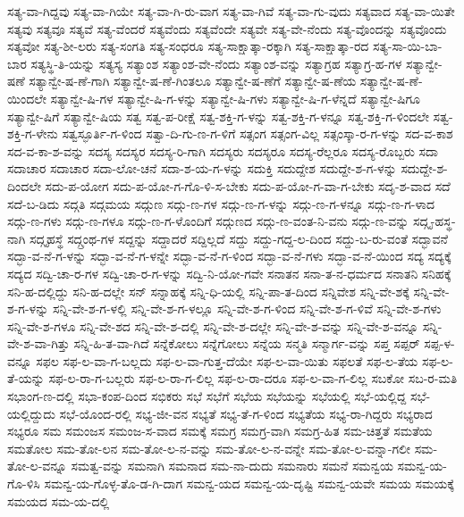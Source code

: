 {ಸತ್ಯ-ವಾ-ಗಿದ್ದವು
ಸತ್ಯ-ವಾ-ಗಿಯೇ
ಸತ್ಯ-ವಾ-ಗಿ-ರು-ವಾಗ
ಸತ್ಯ-ವಾ-ಗಿವೆ
ಸತ್ಯ-ವಾ-ಗು-ವುದು
ಸತ್ಯವಾದ
ಸತ್ಯ-ವಾ-ಯಿತೇ
ಸತ್ಯವು
ಸತ್ಯವೂ
ಸತ್ಯವೆ
ಸತ್ಯ-ವೆಂದರೆ
ಸತ್ಯವೆಂದು
ಸತ್ಯವೆಂದೇ
ಸತ್ಯವೇ
ಸತ್ಯ-ವೇ-ನೆಂದು
ಸತ್ಯ-ವೊಂದನ್ನು
ಸತ್ಯವೊಂದು
ಸತ್ಯವೋ
ಸತ್ಯ-ಶೀ-ಲರು
ಸತ್ಯ-ಸಂಗತಿ
ಸತ್ಯ-ಸಂಧರೂ
ಸತ್ಯ-ಸಾಕ್ಷಾತ್ಕಾ-ರಕ್ಕಾಗಿ
ಸತ್ಯ-ಸಾಕ್ಷಾತ್ಕಾ-ರದ
ಸತ್ಯ-ಸಾ-ಯಿ-ಬಾ-ಬಾರ
ಸತ್ಯಸ್ಥಿ-ತಿ-ಯನ್ನು
ಸತ್ಯಸ್ಯ
ಸತ್ಯಾಂಶ
ಸತ್ಯಾಂಶ-ವೇ-ನೆಂದು
ಸತ್ಯಾಂಶ-ವನ್ನು
ಸತ್ಯಾಗ್ರಹ
ಸತ್ಯಾಗ್ರ-ಹ-ಗಳ
ಸತ್ಯಾನ್ವೇ-ಷಣೆ
ಸತ್ಯಾನ್ವೇ-ಷ-ಣೆ-ಗಾಗಿ
ಸತ್ಯಾನ್ವೇ-ಷ-ಣೆ-ಗಿಂತಲೂ
ಸತ್ಯಾನ್ವೇ-ಷ-ಣೆಗೆ
ಸತ್ಯಾನ್ವೇ-ಷ-ಣೆಯ
ಸತ್ಯಾನ್ವೇ-ಷ-ಣೆ-ಯಿಂದಲೇ
ಸತ್ಯಾನ್ವೇ-ಷಿ-ಗಳ
ಸತ್ಯಾನ್ವೇ-ಷಿ-ಗ-ಳನ್ನು
ಸತ್ಯಾನ್ವೇ-ಷಿ-ಗಳು
ಸತ್ಯಾನ್ವೇ-ಷಿ-ಗ-ಳೆನ್ನದೆ
ಸತ್ಯಾನ್ವೇ-ಷಿಗೂ
ಸತ್ಯಾನ್ವೇ-ಷಿಗೆ
ಸತ್ಯಾನ್ವೇ-ಷಿಯ
ಸತ್ವ
ಸತ್ವ-ಪ-ರೀಕ್ಷೆ
ಸತ್ವ-ಶಕ್ತಿ-ಗ-ಳನ್ನು
ಸತ್ವ-ಶಕ್ತಿ-ಗ-ಳನ್ನೂ
ಸತ್ವ-ಶಕ್ತಿ-ಗ-ಳಿಂದಲೇ
ಸತ್ವ-ಶಕ್ತಿ-ಗ-ಳೇನು
ಸತ್ವಸ್ಫೂರ್ತಿ-ಗ-ಳಿಂದ
ಸತ್ವಾ-ದಿ-ಗು-ಣ-ಗ-ಳಿಗೆ
ಸತ್ಸಂಗ
ಸತ್ಸಂಗ-ವಿಲ್ಲ
ಸತ್ಸಂಸ್ಕಾ-ರ-ಗ-ಳನ್ನು
ಸದ-ವ-ಕಾಶ
ಸದ-ವ-ಕಾ-ಶ-ವನ್ನು
ಸದಸ್ಯ
ಸದಸ್ಯರ
ಸದಸ್ಯ-ರಿ-ಗಾಗಿ
ಸದಸ್ಯರು
ಸದಸ್ಯರೂ
ಸದಸ್ಯ-ರೆಲ್ಲರೂ
ಸದಸ್ಯ-ರೊಬ್ಬರು
ಸದಾ
ಸದಾಚಾರ
ಸದಾಚಾರ
ಸದಾ-ಲೋ-ಚನೆ
ಸದಾ-ಶ-ಯ-ಗ-ಳನ್ನು
ಸದುಕ್ತಿ
ಸದುದ್ದೇಶ
ಸದುದ್ದೇ-ಶ-ಗ-ಳನ್ನು
ಸದುದ್ದೇ-ಶ-ದಿಂದಲೇ
ಸದು-ಪ-ಯೋಗ
ಸದು-ಪ-ಯೋ-ಗ-ಗೊ-ಳಿ-ಸ-ಬೇಕು
ಸದು-ಪ-ಯೋ-ಗ-ವಾ-ಗ-ಬೇಕು
ಸದೃ-ಶ-ವಾದ
ಸದೆ
ಸದೆ-ಬ-ಡಿದು
ಸದ್ಗತಿ
ಸದ್ಗಮಯ
ಸದ್ಗುಣ
ಸದ್ಗು-ಣ-ಗಳ
ಸದ್ಗು-ಣ-ಗ-ಳನ್ನು
ಸದ್ಗು-ಣ-ಗ-ಳನ್ನೂ
ಸದ್ಗು-ಣ-ಗ-ಳಾದ
ಸದ್ಗು-ಣ-ಗಳು
ಸದ್ಗು-ಣ-ಗಳೂ
ಸದ್ಗು-ಣ-ಗ-ಳೊಂದಿಗೆ
ಸದ್ಗುಣದ
ಸದ್ಗು-ಣ-ವಂತ-ನಿ-ವನು
ಸದ್ಗು-ಣ-ವನ್ನು
ಸದ್ಗೃ-ಹಸ್ಥ-ನಾಗಿ
ಸದ್ಗೃಹಸ್ಥೆ
ಸದ್ಗ್ರಂಥ-ಗಳ
ಸದ್ದನ್ನು
ಸದ್ದಾದರೆ
ಸದ್ದಿಲ್ಲದೆ
ಸದ್ದು
ಸದ್ದು-ಗದ್ದ-ಲ-ದಿಂದ
ಸದ್ದು-ಬ-ರು-ವಂತೆ
ಸದ್ಭಾವನೆ
ಸದ್ಭಾ-ವ-ನೆ-ಗ-ಳನ್ನು
ಸದ್ಭಾ-ವ-ನೆ-ಗ-ಳನ್ನೇ
ಸದ್ಭಾ-ವ-ನೆ-ಗ-ಳಿಂದ
ಸದ್ಭಾ-ವ-ನೆ-ಗಳು
ಸದ್ಭಾ-ವ-ನೆ-ಯಿಂದ
ಸದ್ಯ
ಸದ್ಯಕ್ಕೆ
ಸದ್ಯದ
ಸದ್ವಿ-ಚಾ-ರ-ಗಳ
ಸದ್ವಿ-ಚಾ-ರ-ಗ-ಳನ್ನು
ಸದ್ವಿ-ನಿ-ಯೋ-ಗವೇ
ಸನಾತನ
ಸನಾ-ತ-ನ-ಧರ್ಮದ
ಸನಾತನಿ
ಸನಿಹಕ್ಕೆ
ಸನಿ-ಹ-ದಲ್ಲಿದ್ದು
ಸನಿ-ಹ-ದಲ್ಲೇ
ಸನ್
ಸನ್ನಾಹಕ್ಕೆ
ಸನ್ನಿ-ಧಿ-ಯಲ್ಲಿ
ಸನ್ನಿ-ಪಾ-ತ-ದಿಂದ
ಸನ್ನಿವೇಶ
ಸನ್ನಿ-ವೇ-ಶಕ್ಕೆ
ಸನ್ನಿ-ವೇ-ಶ-ಗ-ಳನ್ನು
ಸನ್ನಿ-ವೇ-ಶ-ಗ-ಳಲ್ಲಿ
ಸನ್ನಿ-ವೇ-ಶ-ಗ-ಳಲ್ಲೂ
ಸನ್ನಿ-ವೇ-ಶ-ಗ-ಳಿಂದ
ಸನ್ನಿ-ವೇ-ಶ-ಗ-ಳಿವೆ
ಸನ್ನಿ-ವೇ-ಶ-ಗಳು
ಸನ್ನಿ-ವೇ-ಶ-ಗಳೂ
ಸನ್ನಿ-ವೇ-ಶದ
ಸನ್ನಿ-ವೇ-ಶ-ದಲ್ಲಿ
ಸನ್ನಿ-ವೇ-ಶ-ದಲ್ಲೇ
ಸನ್ನಿ-ವೇ-ಶ-ವನ್ನು
ಸನ್ನಿ-ವೇ-ಶ-ವನ್ನೂ
ಸನ್ನಿ-ವೇ-ಶ-ವಾ-ಗಿತ್ತು
ಸನ್ನಿ-ಹಿ-ತ-ವಾ-ಗಿದೆ
ಸನ್ನೆಕೋಲು
ಸನ್ನೆಗೋಲು
ಸನ್ನೆಯ
ಸನ್ಮತಿ
ಸನ್ಮಾರ್ಗ-ವನ್ನು
ಸಪ್ತ
ಸಪ್ಪರ್
ಸಪ್ಪ-ಳ-ವನ್ನೂ
ಸಫಲ
ಸಫ-ಲ-ವಾ-ಗ-ಬಲ್ಲದು
ಸಫ-ಲ-ವಾ-ಗುತ್ತ-ದೆಯೇ
ಸಫ-ಲ-ವಾ-ಯಿತು
ಸಫಲತೆ
ಸಫ-ಲ-ತೆಯ
ಸಫ-ಲ-ತೆ-ಯನ್ನು
ಸಫ-ಲ-ರಾ-ಗ-ಬಲ್ಲರು
ಸಫ-ಲ-ರಾ-ಗ-ಲಿಲ್ಲ
ಸಫ-ಲ-ರಾ-ದರೂ
ಸಫ-ಲ-ವಾ-ಗ-ಲಿಲ್ಲ
ಸಬಕೋ
ಸಬ-ರ-ಮತಿ
ಸಭಾಂಗ-ಣ-ದಲ್ಲಿ
ಸಭಾ-ಕಂಪ-ದಿಂದ
ಸಭಿಕರು
ಸಭೆ
ಸಭೆಗೆ
ಸಭೆಯ
ಸಭೆಯನ್ನು
ಸಭೆಯಲ್ಲಿ
ಸಭೆ-ಯಲ್ಲಿದ್ದ
ಸಭೆ-ಯಲ್ಲಿದ್ದುದು
ಸಭೆ-ಯೊಂದ-ರಲ್ಲಿ
ಸಭ್ಯ-ಜೀ-ವನ
ಸಭ್ಯತೆ
ಸಭ್ಯ-ತೆ-ಗ-ಳಿಂದ
ಸಭ್ಯತೆಯ
ಸಭ್ಯ-ರಾ-ಗಿದ್ದರು
ಸಭ್ಯರಾದ
ಸಭ್ಯರೂ
ಸಮ
ಸಮಂಜಸ
ಸಮಂಜ-ಸ-ವಾದ
ಸಮಕ್ಕೆ
ಸಮಗ್ರ
ಸಮಗ್ರ-ವಾಗಿ
ಸಮಗ್ರ-ಹಿತ
ಸಮ-ಚಿತ್ತತೆ
ಸಮತೆಯ
ಸಮತೋಲ
ಸಮ-ತೋ-ಲನ
ಸಮ-ತೋ-ಲ-ನ-ವನ್ನು
ಸಮ-ತೋ-ಲ-ನ-ವನ್ನೇ
ಸಮ-ತೋ-ಲ-ವನ್ನಾ-ಗಲೀ
ಸಮ-ತೋ-ಲ-ವನ್ನೂ
ಸಮತ್ವ-ವನ್ನು
ಸಮನಾಗಿ
ಸಮನಾದ
ಸಮ-ನಾ-ದುದು
ಸಮನಾರು
ಸಮನೆ
ಸಮನ್ವಯ
ಸಮನ್ವ-ಯ-ಗೊ-ಳಿಸಿ
ಸಮನ್ವ-ಯ-ಗೊಳ್ಳ-ತೊ-ಡ-ಗಿ-ದಾಗ
ಸಮನ್ವ-ಯದ
ಸಮನ್ವ-ಯ-ದೃಷ್ಟಿ
ಸಮನ್ವ-ಯವೇ
ಸಮಯ
ಸಮಯಕ್ಕೆ
ಸಮಯದ
ಸಮ-ಯ-ದಲ್ಲಿ
}
